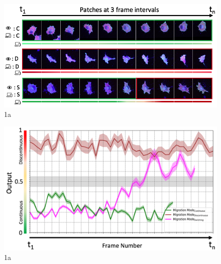 \documentclass{article}
\begin{document}
\begin{figure}
      \centering
      \includegraphics[width=1\linewidth]{paperImages/r2.png}
      \caption{1a}
      \label{fig:sfig1}
\end{figure}    
\begin{figure}
      \centering
      \includegraphics[width=1\linewidth]{paperImages/r1.png}
      \caption{1a}
      \label{fig:sfig1}
\end{figure}    
\end{document}
